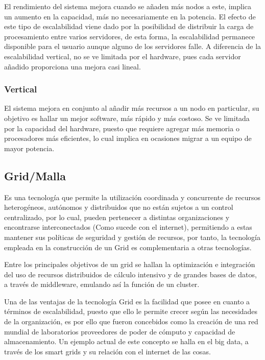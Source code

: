 El rendimiento del sistema mejora cuando se añaden más nodos a este, implica un aumento en la capacidad, más no necesariamente en la potencia. El efecto de este tipo de escalabilidad viene dado por la posibilidad de distribuir la carga de procesamiento entre varios servidores, de esta forma, la escalabilidad permanece disponible para el usuario aunque alguno de los servidores falle. A diferencia de la escalabilidad vertical, no se ve limitada por el hardware, pues cada servidor añadido proporciona una mejora casi lineal. \cite{49dd}

\subsubsection{Vertical}

El sistema mejora en conjunto al añadir más recursos a un nodo en particular, su objetivo es hallar un mejor software, más rápido y más costoso. Se ve limitada por la capacidad del hardware, puesto que requiere agregar más memoria o procesadores más eficientes, lo cual implica en ocasiones migrar a un equipo de mayor potencia.\cite{49dd}

\subsection{Grid/Malla}

Es una tecnología que permite la utilización coordinada y concurrente de recursos heterogéneos, autónomos y distribuidos que no están sujetos a un control centralizado, por lo cual, pueden pertenecer a distintas organizaciones y encontrarse interconectados (Como sucede con el internet), permitiendo a estas mantener sus políticas de seguridad y gestión de recursos, por tanto, la tecnología empleada en la construcción de un Grid es complementaria a otras tecnologías.\cite{50dd}

Entre los principales objetivos de un grid se hallan la optimización e integración del uso de recursos distribuidos de cálculo intensivo y de grandes bases de datos, a través de middleware, emulando así la función de un cluster.\cite{50dd}

Una de las ventajas de la tecnología Grid es la facilidad que posee en cuanto a términos de escalabilidad, puesto que ello le permite crecer según las necesidades de la organización, es por ello que fueron concebidos como la creación de una red mundial de laboratorios proveedores de poder de cómputo y capacidad de almacenamiento. Un ejemplo actual de este concepto se halla en el big data, a través de los smart grids y su relación con el internet de las cosas.\cite{50dd}

